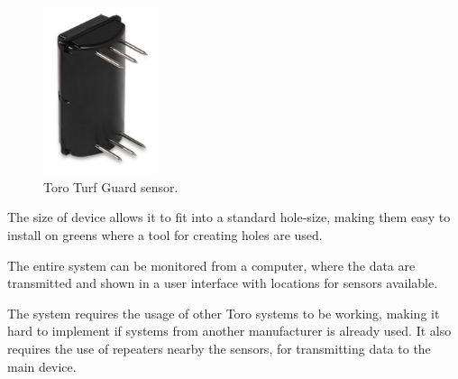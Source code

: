 \begin{figure}
\begin{center}
\includegraphics[width=0.3\textwidth]{chapters/analysis/figs/Turfguard.png}
\caption{Toro Turf Guard\texttrademark{} sensor\cite{turfGuard2}.}
\label{fig:turfguard}
\end{center}
\end{figure}



The size of device allows it to fit into a standard hole-size, making them easy to install on greens where a tool for creating holes are used\cite{turfGuard2}.

The entire system can be monitored from a computer, where the data are transmitted and shown in a user interface with locations for sensors available\cite{turfGuard2}.

The system requires the usage of other Toro systems to be working, making it hard to implement if systems from another manufacturer is already used. It also requires the use of repeaters nearby the sensors, for transmitting data to the main device\cite{turfGuard2}.
